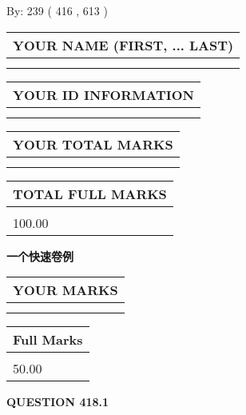 \documentclass{ctexart}
\begin{document}
   
\hspace{1.0in} By: 
 239 ( 416 ,  613 )
   
   
   
   
\newpage 
\setcounter{page}{ 
   418001 } 
   
   
   
   
\noindent\begin{tabular}{|l|}
\hline
YOUR NAME (FIRST, ... LAST)  \\
\hline
 \\ 
 \\ 
\hline
\end{tabular}
\hspace{0.05in} \begin{tabular}{|l|}
\hline
 YOUR   ID   INFORMATION  \\
\hline
 \\ 
 \\ 
\hline
\end{tabular}
   
   
\vspace{0.2in}\noindent\begin{tabular}{|l|}
\hline
YOUR TOTAL MARKS  \\
\hline
 \\ 
 \\ 
\hline
\end{tabular}
\hspace{0.05in} \begin{tabular}{|l|}
\hline
TOTAL FULL MARKS  \\
\hline
 \\ 
100.00 \\
\hline
\end{tabular}
   
   
 \vspace{0.2in}
{\LARGE {\textbf{ 一个快速卷例}}}
   
   
  
\vspace{0.2in}
  
\noindent\begin{tabular}{|l|}
\hline
 YOUR MARKS  \\
\hline
 \\ 
 \\ 
\hline
\end{tabular}
\hspace{0.05in} \begin{tabular}{|l|}
\hline
 Full Marks  \\
\hline
 \\ 
50.00 \\
\hline
\end{tabular}
{\textbf{\Large{QUESTION
418.1 
}}}
  
\end{document}
